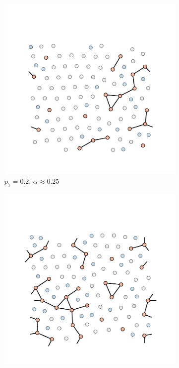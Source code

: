 \begin{figure}[bt]
     \centering
     
     \begin{subfigure}[b]{0.3\textwidth}
         \centering
         \includegraphics[width=\textwidth]{./figures/targeted_opt/percolation_p7_2.pdf}
         \caption{$p_7=0.2$, $\alpha\approx0.25$}
         \label{fig:percp7a}
     \end{subfigure}
     \hfill
      \begin{subfigure}[b]{0.3\textwidth}
         \centering
         \includegraphics[width=\textwidth]{./figures/targeted_opt/percolation_p7_3.pdf}

\end{subfigure}
\end{figure}
